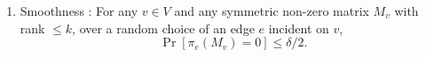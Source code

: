 \begin{theorem}
\begin{enumerate}
\item Smoothness : For any $v \in V$ and any symmetric  non-zero matrix $M_v$ with rank $\leq k$, over a random choice of an edge $e$ incident on $v$,
$$ \Pr[\pi_e(M_v) = 0] \leq \delta/2.$$

\end{enumerate}
\end{theorem}
